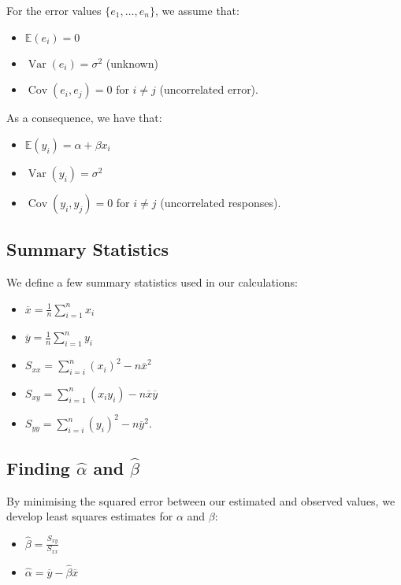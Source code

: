 \documentclass[a4paper, 12pt, twoside]{article}
\DeclareMathOperator{\Var}{Var}
\DeclareMathOperator{\Cov}{Cov}
\begin{document}
For the error values $\{e_1, \ldots, e_n\}$, we assume that:
\begin{itemize}
    \item $\mathbb{E}(e_i) = 0$
    \item $\Var(e_i) = \sigma^2$ (unknown)
    \item $\Cov(e_i, e_j) = 0$ for $i \neq j$ (uncorrelated error).
\end{itemize}
As a consequence, we have that:
\begin{itemize}
    \item $\mathbb{E}(y_i) = \alpha + \beta x_i$
    \item $\Var(y_i) = \sigma^2$
    \item $\Cov(y_i, y_j) = 0$ for $i \neq j$ (uncorrelated responses).
\end{itemize}

\subsection{Summary Statistics}

We define a few summary statistics used in our calculations:
\begin{itemize}
    \item $\overline{x} = \frac{1}{n}\sum_{i = 1}^n x_i$
    \item $\overline{y} = \frac{1}{n}\sum_{i = 1}^n y_i$
    \item $S_{xx} = \sum_{i=i}^n (x_i)^2 - n\overline{x}^2$
    \item $S_{xy} = \sum_{i=1}^n (x_i y_i) - n\overline{x}\overline{y}$
    \item $S_{yy} = \sum_{i=i}^n (y_i)^2 - n\overline{y}^2.$
\end{itemize}

\newpage

\subsection{Finding $\hat\alpha$ and $\hat\beta$}

By minimising the squared error between our estimated and observed
values, we develop least squares estimates for $\alpha$ and $\beta$:
\begin{itemize}
    \item $\hat\beta = \frac{S_{xy}}{S_{xx}}$
    \item $\hat\alpha = \overline{y} - \hat\beta\overline{x}$
\end{itemize}
\end{document}
